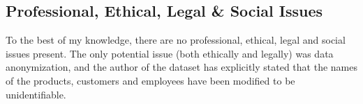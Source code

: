 \documentclass[a4paper,11pt]{article}
\begin{document}
\subsection{Professional, Ethical, Legal \& Social Issues}
To the best of my knowledge, there are no professional, ethical, legal and social issues present. The only potential issue (both ethically and legally) was data anonymization,  and the author of the dataset has explicitly stated \cite{data_source} that the names of the products, customers and employees have been modified to be unidentifiable.



\newpage
\printbibliography
\end{document}
